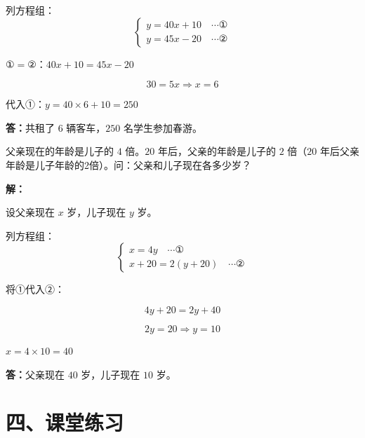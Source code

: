 \documentclass[12pt, a4paper]{ctexart}
\begin{document}
列方程组：
$$\begin{cases} y = 40x + 10 \quad \cdots ① \\ y = 45x - 20 \quad \cdots ② \end{cases}$$

$① = ②$：$40x + 10 = 45x - 20$

$$30 = 5x \Rightarrow x = 6$$

代入①：$y = 40 \times 6 + 10 = 250$

\textbf{答：}共租了 $6$ 辆客车，$250$ 名学生参加春游。

\bigskip

\begin{appbox}[【应用6】年龄问题]
父亲现在的年龄是儿子的 $4$ 倍。$20$ 年后，父亲的年龄是儿子的 $2$ 倍（$20$ 年后父亲年龄是儿子年龄的2倍）。问：父亲和儿子现在各多少岁？
\end{appbox}

\textbf{解：}

设父亲现在 $x$ 岁，儿子现在 $y$ 岁。

列方程组：
$$\begin{cases} x = 4y \quad \cdots ① \\ x + 20 = 2(y + 20) \quad \cdots ② \end{cases}$$

将①代入②：

$$4y + 20 = 2y + 40$$

$$2y = 20 \Rightarrow y = 10$$

$x = 4 \times 10 = 40$

\textbf{答：}父亲现在 $40$ 岁，儿子现在 $10$ 岁。

\section*{\textcolor{tipgreen}{四、课堂练习}}
\end{document}
